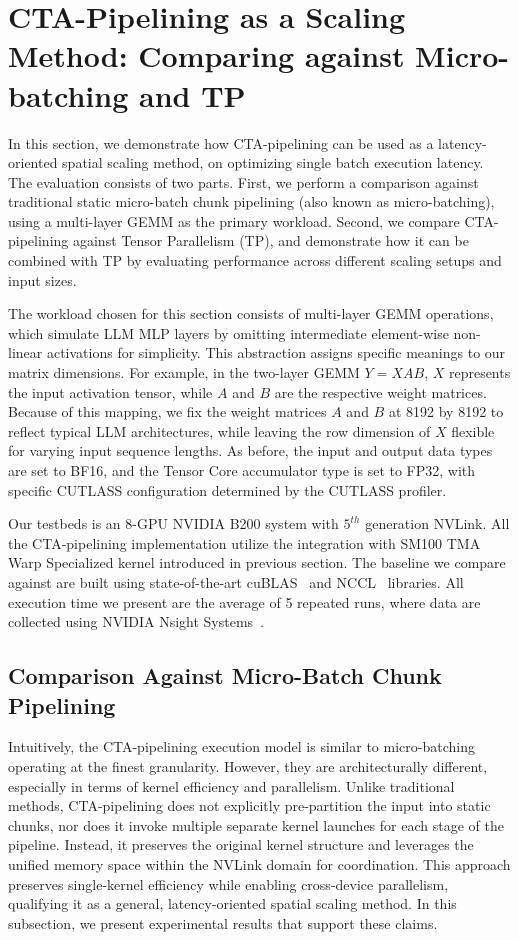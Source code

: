 \section{CTA-Pipelining as a Scaling Method: Comparing against Micro-batching and TP} 

In this section, we demonstrate how CTA-pipelining can be used as a latency-oriented spatial scaling method, on optimizing single batch execution latency. The evaluation consists of two parts. First, we perform a comparison against traditional static micro-batch chunk pipelining (also known as micro-batching), using a multi-layer GEMM as the primary workload. Second, we compare CTA-pipelining against Tensor Parallelism (TP), and demonstrate how it can be combined with TP by evaluating performance across different scaling setups and input sizes.

The workload chosen for this section consists of multi-layer GEMM operations, which simulate LLM MLP layers by omitting intermediate element-wise non-linear activations for simplicity. This abstraction assigns specific meanings to our matrix dimensions. For example, in the two-layer GEMM $Y=XAB$, $X$ represents the input activation tensor, while $A$ and $B$ are the respective weight matrices. Because of this mapping, we fix the weight matrices $A$ and $B$ at 8192 by 8192 to reflect typical LLM architectures, while leaving the row dimension of $X$ flexible for varying input sequence lengths. As before, the input and output data types are set to BF16, and the Tensor Core accumulator type is set to FP32, with specific CUTLASS configuration determined by the CUTLASS profiler. 

Our testbeds is an 8-GPU NVIDIA B200 system with $5^{th}$ generation NVLink. All the CTA-pipelining implementation utilize the integration with SM100 TMA Warp Specialized kernel introduced in previous section. The baseline we compare against are built using state-of-the-art cuBLAS~\cite{cublas} and NCCL~\cite{nccl} libraries. All execution time we present are the average of 5 repeated runs, where data are collected using NVIDIA Nsight Systems~\cite{nsight}. 

\subsection{Comparison Against Micro-Batch Chunk Pipelining}

Intuitively, the CTA-pipelining execution model is similar to micro-batching operating at the finest granularity. However, they are architecturally different, especially in terms of kernel efficiency and parallelism. Unlike traditional methods, CTA-pipelining does not explicitly pre-partition the input into static chunks, nor does it invoke multiple separate kernel launches for each stage of the pipeline. Instead, it preserves the original kernel structure and leverages the unified memory space within the NVLink domain for coordination. This approach preserves single-kernel efficiency while enabling cross-device parallelism, qualifying it as a general, latency-oriented spatial scaling method. In this subsection, we present experimental results that support these claims.

